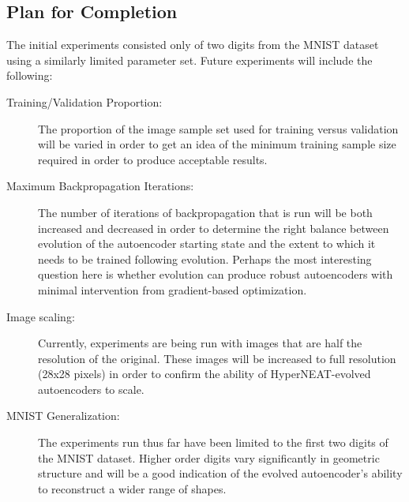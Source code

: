 \documentclass{acm_proc_article-sp}
\begin{document}
\subsection{Plan for Completion}

The initial experiments consisted only of two digits from the MNIST dataset using a similarly limited parameter set.  Future experiments will include the following:

\begin{description}
	\item[Training/Validation Proportion:] The proportion of the image sample set used for training versus validation will be varied in order to get an idea of the minimum training sample size required in order to produce acceptable results.
	\item[Maximum Backpropagation Iterations:] The number of iterations of backpropagation that is run will be both increased and decreased in order to determine the right balance between evolution of the autoencoder starting state and the extent to which it needs to be trained following evolution.  Perhaps the most interesting question here is whether evolution can produce robust autoencoders with minimal intervention from gradient-based optimization.
	\item[Image scaling:] Currently, experiments are being run with images that are half the resolution of the original.  These images will be increased to full resolution (28x28 pixels) in order to confirm the ability of HyperNEAT-evolved autoencoders to scale.
	\item[MNIST Generalization:] The experiments run thus far have been limited to the first two digits of the MNIST dataset.  Higher order digits vary significantly in geometric structure and will be a good indication of the evolved autoencoder's ability to reconstruct a wider range of shapes.
\end{description}




\balancecolumns
\end{document}
